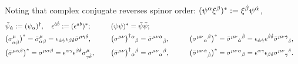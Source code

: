 \documentclass[CheatSheet]{subfiles}
\begin{document}
Noting that complex conjugate reverses spinor order: $(\psi^\alpha\xi^\beta)^* := \xi^{\dot\beta}\psi^{\dot\alpha}$,
\begin{alignat*}{3}
&  \bar\psi_{\dot\alpha} := (\psi_\alpha)^\dagger,
\quad
  \epsilon^{\dot a\dot b} := (\epsilon^{ab})^*;
\qquad&&
(\psi\psi)^* = \bar\psi\bar\psi;
\\
&\bigl(\sigma^{\mu}_{\alpha {\dot\beta}}\bigr)^*=\bar\sigma^\mu_{{\dot\alpha}\beta}=\epsilon_{{\dot\alpha}{\dot\gamma}} \epsilon_{\beta \delta} \bar\sigma^{\mu{\dot\gamma}\delta},
&&
\bigl(\sigma^{\mu\nu}\bigr)^\dagger{}^\alpha{}_\beta
= \bar\sigma^{\mu\nu}{}^{\dot\alpha}{}_{\dot\beta},
&\qquad&
\bigl(\sigma^{\mu\nu}{}_\alpha{}^\beta\bigr)^*
= \bar\sigma^{\mu\nu}{}_{\dot\alpha}{}^{\dot\beta}
= \epsilon_{{\dot\alpha}{\dot\gamma}}\epsilon^{{\dot\beta}{\dot\delta}}\bar\sigma^{\mu\nu}{}^{{\dot\gamma}}{}_{{\dot\delta}},
\\
&
\bigl(\bar\sigma^{\mu{\dot\alpha}\beta}\bigr)^*=
\sigma^{\mu\alpha{\dot\beta}}=
\epsilon^{\alpha\gamma}\epsilon ^{{\dot\beta}{\dot\delta}} \sigma^{\mu}_{\gamma{\dot\delta}},
&&
\bigl(\bar\sigma^{\mu\nu}\bigr)^\dagger{}_{\dot\alpha}{}^{\dot\beta}
= \sigma^{\mu\nu}{}_\alpha{}^\beta,
&&
\bigl(\bar\sigma^{\mu\nu}{}^{{\dot\alpha}}{}_{{\dot\beta}}\bigr)^*
= \sigma^{\mu\nu}{}^{\alpha}{}_{\beta}
= \epsilon^{\alpha\gamma}\epsilon_{\beta\delta}\sigma^{\mu\nu}{}_{\gamma}{}^{\delta}.
\end{alignat*}
\end{document}
